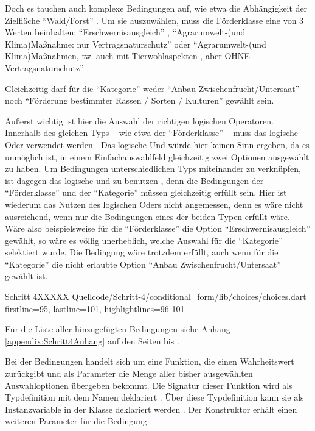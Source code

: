 Doch es tauchen auch komplexe Bedingungen auf,
wie etwa die Abhängigkeit der Zielfläche \enquote{Wald/Forst} \Lst{\ref{lst:Schritt4wald}}.
Um sie auszuwählen,
muss die Förderklasse eine von 3 Werten beinhalten:
\enquote{Erschwernisausgleich} ,
\enquote{Agrarumwelt-(und Klima)Maßnahme: nur Vertragsnaturschutz}  oder
\enquote{Agrarumwelt-(und Klima)Maßnahmen, tw. auch mit Tierwohlaspekten , aber OHNE Vertragsnaturschutz} .

Gleichzeitig darf für die \enquote{Kategorie} weder
\enquote{Anbau Zwischenfrucht/Untersaat} 
noch
\enquote{Förderung bestimmter Rassen / Sorten / Kulturen} 
gewählt sein.

Äußerst wichtig ist hier die Auswahl der richtigen logischen Operatoren.
Innerhalb des gleichen Typs -- wie etwa der \enquote{Förderklasse} -- muss das logische Oder \IC{||} verwendet werden .
Das logische Und würde hier keinen Sinn ergeben,
da es unmöglich ist,
in einem Einfachauswahlfeld gleichzeitig zwei Optionen ausgewählt zu haben.
Um Bedingungen unterschiedlichen Typs miteinander zu verknüpfen,
ist dagegen das logische und \IC{&&} zu benutzen ,
denn die Bedingungen der \enquote{Förderklasse} und der \enquote{Kategorie} müssen gleichzeitig erfüllt sein.
Hier ist wiederum das Nutzen des logischen Oders nicht angemessen, denn es wäre nicht ausreichend,
wenn nur die Bedingungen eines der beiden Typen erfüllt wäre.
Wäre also beispielsweise für die \enquote{Förderklasse} die Option \enquote{Erschwernisausgleich} gewählt,
so wäre es völlig unerheblich,
welche Auswahl für die \enquote{Kategorie} selektiert wurde.
Die Bedingung wäre trotzdem erfüllt,
auch wenn für die \enquote{Kategorie} die nicht erlaubte Option \enquote{Anbau Zwischenfrucht/Untersaat} gewählt ist.

\begin{alexlisting}{Schritt 4}{XXXXX}
  {Quellcode/Schritt-4/conditional_form/lib/choices/choices.dart}
  {firstline=95, lastline=101, highlightlines={96-101}}
  \label{lst:Schritt4wald}
\end{alexlisting}

Für die Liste aller hinzugefügten Bedingungen siehe Anhang \ref{appendix:Schritt4Anhang} auf den Seiten \pageref{lst:Schritt4KategorieChoice} bis  \pageref{lst:Schritt4ZieleinheitChoice}.

Bei der Bedingungen handelt sich um eine Funktion,
die einen Wahrheitswert  zurückgibt und als Parameter die Menge aller bisher ausgewählten Auswahloptionen  übergeben bekommt.
Die Signatur dieser Funktion wird als Typdefinition mit dem Namen  deklariert .
Über diese Typdefinition kann sie als Instanzvariable in der Klasse  deklariert werden .
Der Konstruktor erhält einen weiteren Parameter für die Bedingung .

